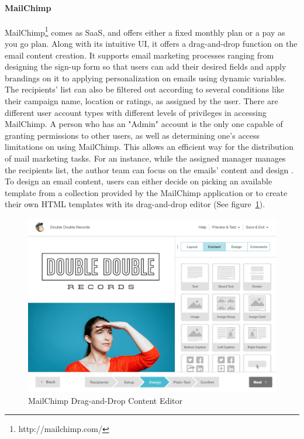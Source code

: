 \paragraph{MailChimp}
MailChimp\footnote{http://mailchimp.com/} comes as \ac{SaaS}, and offers either a fixed monthly plan or a pay as you go plan. Along with its intuitive \ac{UI}, it offers a drag-and-drop function on the email content creation. It supports email marketing processes ranging from designing the sign-up form so that users can add their desired fields and apply brandings on it to applying personalization on emails using dynamic variables. The recipients' list can also be filtered out according to several conditions like their campaign name, location or ratings, as assigned by the user. There are different user account types with different levels of privileges in accessing MailChimp. A person who has an "Admin" account is the only one capable of granting permissions to other users, as well as determining one's access limitations on using MailChimp. This allows an efficient way for the distribution of mail marketing tasks. For an instance, while the assigned manager manages the recipients list, the author team can focus on the emails' content and design \citep{TheRocketScienceGroupLLC2013}. To design an email content, users can either decide on picking an available template from a collection provided by the MailChimp application or to create their own \ac{HTML} templates with its drag-and-drop editor (See figure~\ref{fig:MailChimp-DragAndDropEditor}).
\vspace{1cm}

\begin{figure}[H]
	\centering
	\includegraphics[width=1.00\textwidth]{imgs/MailChimp-DragAndDropEditor.jpg}
	\caption[MailChimp Drag-and-Drop Content Editor]{MailChimp Drag-and-Drop Content Editor \citep{TheRocketScienceGroupLLC2013a}}
	\label{fig:MailChimp-DragAndDropEditor}
\end{figure}

